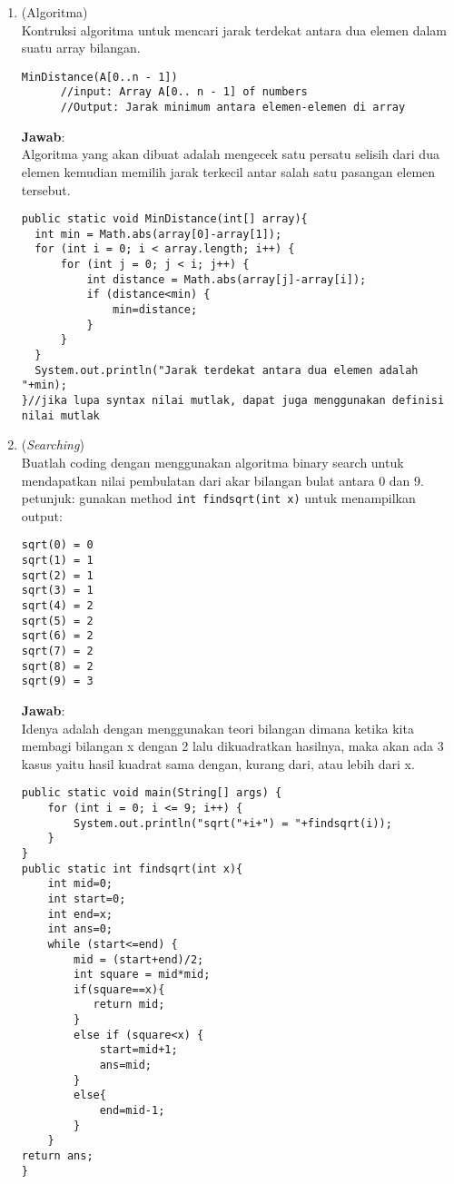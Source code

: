 \documentclass{article}
\newcommand{\jawab}{\textbf{Jawab}:}
\begin{document}
\begin{enumerate}
    \item (Algoritma)\\
    Kontruksi algoritma untuk mencari jarak terdekat antara dua elemen dalam suatu array bilangan.
    \begin{lstlisting}
MinDistance(A[0..n - 1])
      //input: Array A[0.. n - 1] of numbers
      //Output: Jarak minimum antara elemen-elemen di array
    \end{lstlisting}
    \jawab\\
    Algoritma yang akan dibuat adalah mengecek satu persatu selisih dari dua elemen kemudian 
    memilih jarak terkecil antar salah satu pasangan elemen tersebut.
    \begin{lstlisting}
public static void MinDistance(int[] array){
  int min = Math.abs(array[0]-array[1]);
  for (int i = 0; i < array.length; i++) {
      for (int j = 0; j < i; j++) {
          int distance = Math.abs(array[j]-array[i]);
          if (distance<min) {
              min=distance;
          }
      }
  }
  System.out.println("Jarak terdekat antara dua elemen adalah "+min);
}//jika lupa syntax nilai mutlak, dapat juga menggunakan definisi nilai mutlak
    \end{lstlisting}
    \item (\textit{Searching})\\
    Buatlah coding dengan menggunakan algoritma binary search untuk mendapatkan nilai 
    pembulatan dari akar bilangan bulat antara 0 dan 9.\\
    petunjuk: gunakan method \texttt{int findsqrt(int x)} untuk menampilkan output:
    \begin{lstlisting}
sqrt(0) = 0
sqrt(1) = 1
sqrt(2) = 1
sqrt(3) = 1
sqrt(4) = 2
sqrt(5) = 2
sqrt(6) = 2
sqrt(7) = 2
sqrt(8) = 2
sqrt(9) = 3
    \end{lstlisting}
    \jawab\\
    Idenya adalah dengan menggunakan teori bilangan dimana ketika kita membagi bilangan x dengan 
    2 lalu dikuadratkan hasilnya, maka akan ada 3 kasus yaitu hasil kuadrat sama dengan, kurang 
    dari, atau lebih dari x.
    \begin{lstlisting}
public static void main(String[] args) {
    for (int i = 0; i <= 9; i++) {
        System.out.println("sqrt("+i+") = "+findsqrt(i));
    }
}
public static int findsqrt(int x){
    int mid=0;
    int start=0;
    int end=x;
    int ans=0;
    while (start<=end) {
        mid = (start+end)/2;
        int square = mid*mid;
        if(square==x){
           return mid; 
        }
        else if (square<x) {
            start=mid+1;
            ans=mid;
        }
        else{
            end=mid-1;
        }
    }
return ans;
}
    \end{lstlisting}


\end{enumerate}
\end{document}
